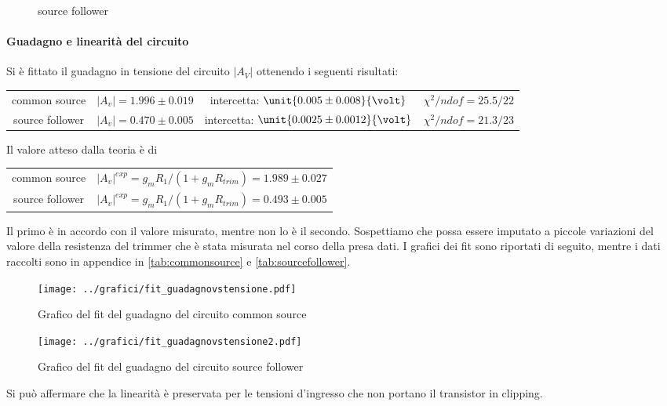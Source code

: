 \documentclass[10pt,a4paper]{article}
\begin{document}
\begin{figure}[h!]
\begin{minipage}[h!]{0.45\textwidth}
		\caption{source follower}
			\label{infase}
	\end{minipage}
\end{figure}

\paragraph{Guadagno e linearità del circuito} Si è fittato il guadagno in tensione del circuito $|A_V|$ ottenendo i seguenti risultati:

\begin{table}[h!]
	\centering
	\begin{tabular}{c|ccc}
		common source & $|A_v| = 1.996 \pm 0.019$ & intercetta: $\unit{0.005 \pm 0.008}{\volt}$ & $\chi^2 / ndof = 25.5 / 22$\\
		source follower &	$|A_v| = 0.470 \pm 0.005$ & intercetta: $\unit{0.0025 \pm 0.0012}{\volt}$ & $\chi^2 / ndof = 21.3 / 23$
	\end{tabular}
\end{table}

Il valore atteso dalla teoria è di
\begin{table}[h!]
	\centering
	\begin{tabular}{c|c}
		common source & $|A_v|^{exp} =g_mR_1/(1+g_mR_{trim}) = 1.989 \pm 0.027$ \\
		source follower &	$|A_v|^{exp} =g_mR_1/(1+g_mR_{trim}) = 0.493 \pm 0.005$
	\end{tabular}
\end{table}

Il primo è in accordo con il valore misurato, mentre non lo è il secondo. Sospettiamo che possa essere imputato a piccole variazioni del valore della resistenza del trimmer che è stata misurata nel corso della presa dati.
I grafici dei fit sono riportati di seguito, mentre i dati raccolti sono in appendice in \tablename{\ref{tab:commonsource}} e \tablename{\ref{tab:sourcefollower}}.

\begin{figure}[h!]
	\centering
	\texttt{[image: ../grafici/fit\_guadagnovstensione.pdf]}
	\caption{Grafico del fit del guadagno del circuito common source}
\end{figure}

\begin{figure}[h!]
	\centering
	\texttt{[image: ../grafici/fit\_guadagnovstensione2.pdf]}
	\caption{Grafico del fit del guadagno del circuito source follower}
\end{figure}
 Si può affermare che la linearità è preservata per le tensioni d'ingresso che non portano il transistor in clipping.
  
\end{document}
